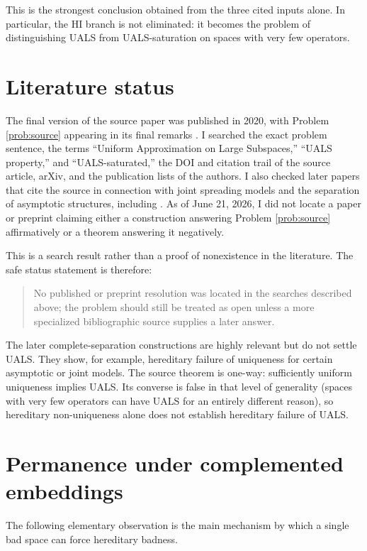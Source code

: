 \documentclass[11pt]{article}
\theoremstyle{definition}
\theoremstyle{remark}
\begin{document}
This is the strongest conclusion obtained from the three cited inputs alone.  In particular, the HI branch is not eliminated: it becomes the problem of distinguishing UALS from UALS-saturation on spaces with very few operators.

\section{Literature status}

The final version of the source paper was published in 2020, with Problem \ref{prob:source} appearing in its final remarks \cite{AGLM}.  I searched the exact problem sentence, the terms ``Uniform Approximation on Large Subspaces,'' ``UALS property,'' and ``UALS-saturated,'' the DOI and citation trail of the source article, arXiv, and the publication lists of the authors.  I also checked later papers that cite the source in connection with joint spreading models and the separation of asymptotic structures, including \cite{AM,AGM,AMS,GMS}.  As of June 21, 2026, I did not locate a paper or preprint claiming either a construction answering Problem \ref{prob:source} affirmatively or a theorem answering it negatively.

This is a search result rather than a proof of nonexistence in the literature.  The safe status statement is therefore:

\begin{quote}
No published or preprint resolution was located in the searches described above; the problem should still be treated as open unless a more specialized bibliographic source supplies a later answer.
\end{quote}

The later complete-separation constructions are highly relevant but do not settle UALS.  They show, for example, hereditary failure of uniqueness for certain asymptotic or joint models.  The source theorem is one-way: sufficiently uniform uniqueness implies UALS.  Its converse is false in that level of generality (spaces with very few operators can have UALS for an entirely different reason), so hereditary non-uniqueness alone does not establish hereditary failure of UALS.

\section{Permanence under complemented embeddings}

The following elementary observation is the main mechanism by which a single bad space can force hereditary badness.
\end{document}
